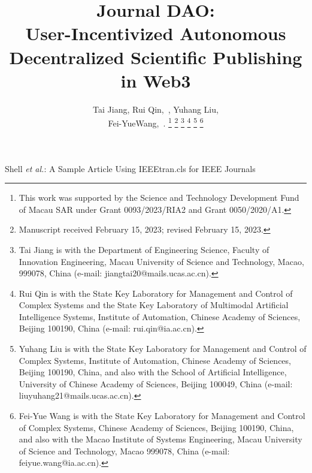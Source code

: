\documentclass[lettersize,journal]{IEEEtran}
\begin{document}
\title{Journal DAO: \\ User-Incentivized Autonomous Decentralized Scientific Publishing in Web3}

\author{Tai Jiang, Rui Qin,~, Yuhang Liu, \\
 Fei-YueWang,~.
\thanks{This work was supported by the Science and Technology Development Fund of Macau SAR under Grant 0093/2023/RIA2 and  Grant 0050/2020/A1.}%
\thanks{Manuscript received February 15, 2023; revised February 15, 2023.}
\thanks{Tai Jiang is with the Department of Engineering Science, Faculty of Innovation Engineering, Macau University of Science and Technology, Macao, 999078, China (e-mail: jiangtai20@mails.ucas.ac.cn).}
\thanks{Rui Qin is with the State Key Laboratory for Management and Control of Complex Systems and the State Key Laboratory of Multimodal Artificial Intelligence Systems, Institute of Automation, Chinese Academy of Sciences, Beijing 100190, China (e-mail: rui.qin@ia.ac.cn).}
\thanks{Yuhang Liu is with the State Key Laboratory for Management and Control of Complex Systems, Institute of Automation, Chinese Academy of Sciences, Beijing 100190, China, and also with the School of Artificial Intelligence, University of Chinese Academy of Sciences, Beijing 100049, China (e-mail: liuyuhang21@mails.ucas.ac.cn).}
\thanks{Fei-Yue Wang is with the State Key Laboratory for Management and Control of Complex Systems, Chinese Academy of Sciences, Beijing 100190, China, and also with the Macao Institute of Systems Engineering, Macau University of Science and Technology, Macao 999078, China (e-mail: feiyue.wang@ia.ac.cn).}

}

%
{Shell \MakeLowercase{\textit{et al.}}: A Sample Article Using IEEEtran.cls for IEEE Journals}


\maketitle
\end{document}
